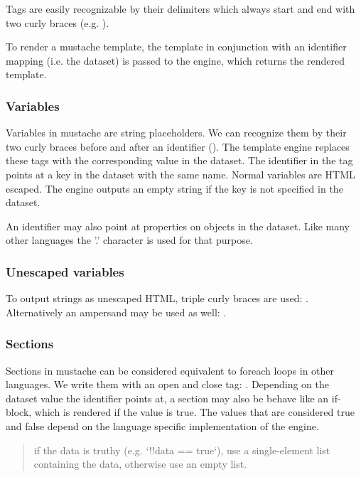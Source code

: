 \documentclass[thesis.tex]{subfiles}
\begin{document}
Tags are easily recognizable by their delimiters which always start and end with
two curly braces (e.g. ).

To render a mustache template, the template in conjunction with an
identifier mapping (i.e. the dataset) is passed to the engine, which returns the
rendered template.

\subsubsection{Variables}
\label{sect:mustache-vars}
Variables in mustache are string placeholders. We can recognize them by their
two curly braces before and after an identifier ().
The template engine replaces these tags with the corresponding value in the
dataset.
The identifier in the tag points at a key in the dataset with the same name.
Normal variables are HTML escaped. The engine outputs an empty string if the
key is not specified in the dataset.

An identifier may also point at properties on objects in the dataset. Like many
other languages the '.' character is used for that purpose.

\subsubsection{Unescaped variables}
To output strings as unescaped HTML, triple curly braces are used:
. Alternatively an ampersand may be used as well:
.

\subsubsection{Sections}
Sections in mustache can be considered equivalent to foreach loops in other
languages. We write them with an open and close tag:
.
Depending on the dataset value the identifier points at, a section may also be
behave like an if-block, which is rendered if the value is true. The values that
are considered true and false depend on the language specific implementation
of the engine.
\begin{quote}
	if the data is truthy (e.g. `!!data == true`), use a single-element list
	containing the data, otherwise use an empty list. \cite[sections.yml]{MSTSPEC}
\end{quote}
\end{document}
